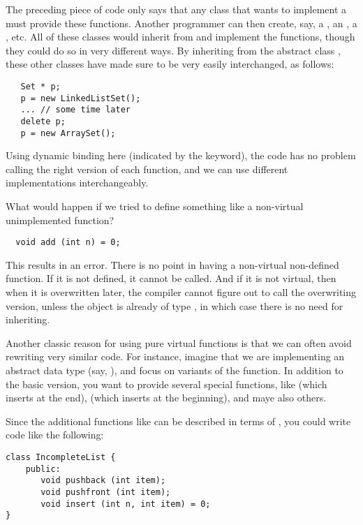 The preceding piece of code only says that any class that wants to
implement a  must provide these functions.
Another programmer can then create, say, a , an
, a , etc.
All of these classes would inherit from  and implement the
functions, though they could do so in very different ways.
By inheriting from the abstract class , these other classes
have made sure to be very easily interchanged, as follows:

\begin{verbatim}
   Set * p;
   p = new LinkedListSet();
   ... // some time later
   delete p;
   p = new ArraySet();
\end{verbatim}
Using dynamic binding here (indicated by the  keyword),
the code has no problem calling the right version of each function,
and we can use different implementations interchangeably.

What would happen if we tried to define something
like a non-virtual unimplemented function?
\begin{verbatim}
  void add (int n) = 0;
\end{verbatim}
This results in an error. There is no point in having a non-virtual
non-defined function. If it is not defined, it cannot be called.
And if it is not virtual, then when it is overwritten later, the compiler
cannot figure out to call the overwriting version, unless the object is
already of type , in which case there is no need for inheriting.

\medskip

Another classic reason for using pure virtual functions is that we can 
often avoid rewriting very similar code.
For instance, imagine that we are implementing an abstract data type
(say, ),
and focus on variants of the  function. 
In addition to the basic  version, you want to provide
several special functions, like  (which inserts at the
end),  (which inserts at the beginning), and maye also
others.

Since the additional functions like  can be described
in terms of , you could write code like the following: 

\begin{verbatim}
class IncompleteList {
    public:
       void pushback (int item);
       void pushfront (int item);
       void insert (int n, int item) = 0;
}
\end{verbatim}

